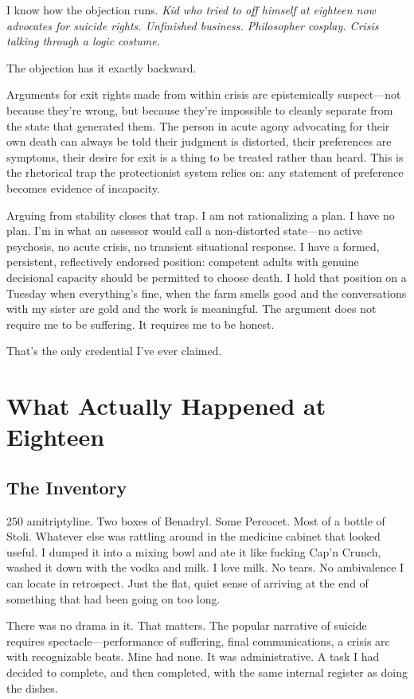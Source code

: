 \documentclass[10pt, letterpaper, twocolumn]{article}
\begin{document}
I know how the objection runs. \textit{Kid who tried to off himself at eighteen now advocates for suicide rights. Unfinished business. Philosopher cosplay. Crisis talking through a logic costume.}

The objection has it exactly backward.

Arguments for exit rights made from within crisis are epistemically suspect---not because they're wrong, but because they're impossible to cleanly separate from the state that generated them. The person in acute agony advocating for their own death can always be told their judgment is distorted, their preferences are symptoms, their desire for exit is a thing to be treated rather than heard. This is the rhetorical trap the protectionist system relies on: any statement of preference becomes evidence of incapacity.

Arguing from stability closes that trap. I am not rationalizing a plan. I have no plan. I'm in what an assessor would call a non-distorted state---no active psychosis, no acute crisis, no transient situational response. I have a formed, persistent, reflectively endorsed position: competent adults with genuine decisional capacity should be permitted to choose death. I hold that position on a Tuesday when everything's fine, when the farm smells good and the conversations with my sister are gold and the work is meaningful. The argument does not require me to be suffering. It requires me to be honest.

That's the only credential I've ever claimed.

\section{What Actually Happened at Eighteen}

\subsection{The Inventory}

250 amitriptyline. Two boxes of Benadryl. Some Percocet. Most of a bottle of Stoli. Whatever else was rattling around in the medicine cabinet that looked useful. I dumped it into a mixing bowl and ate it like fucking Cap'n Crunch, washed it down with the vodka and milk. I love milk.  No tears. No ambivalence I can locate in retrospect. Just the flat, quiet sense of arriving at the end of something that had been going on too long.

There was no drama in it. That matters. The popular narrative of suicide requires spectacle---performance of suffering, final communications, a crisis arc with recognizable beats. Mine had none. It was administrative. A task I had decided to complete, and then completed, with the same internal register as doing the dishes.
\end{document}
